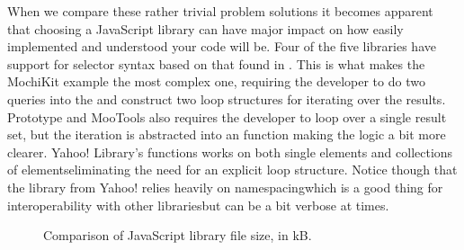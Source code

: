 When we compare these rather trivial problem solutions it becomes apparent
that choosing a JavaScript library can have major impact on how easily
implemented and understood your code will be. Four of the five libraries
have support for selector syntax based on
that found in .%
This is what makes the MochiKit example the most complex one, requiring the
developer to do two queries into the  and construct two
loop structures for iterating over the results.
Prototype and MooTools also requires the developer to loop over a single
result set, but the iteration is abstracted into an  function
making the logic a bit more clearer. Yahoo!  Library's 
functions works on both single elements and collections of
elements\dash{}eliminating the need for an explicit loop structure.
Notice though that the library from
Yahoo! relies heavily on namespacing\dash{}which is a good thing for
interoperability with other libraries\dash{}but can be a bit verbose at times.

\begin{figure}

  \caption[JavaScript Library Comparison]{%
    Comparison of JavaScript library file size, in kB.
  }
  \label{figure:chart.javascript.size}
\end{figure}

